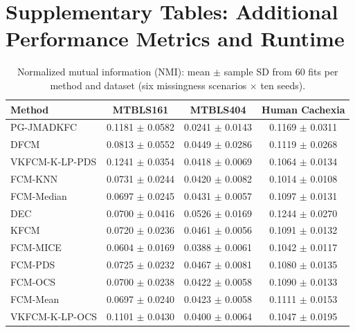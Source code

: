 \section*{Supplementary Tables: Additional Performance Metrics and Runtime}

\begin{table}[t]
\centering
\caption{Normalized mutual information (NMI): mean $\pm$ sample SD from 60 fits per method and dataset (six missingness scenarios $\times$ ten seeds).}
\label{tab:supp_nmi}
\small
\setlength{\tabcolsep}{5pt}
\begin{tabular}{lccc}
\toprule
Method & MTBLS161 & MTBLS404 & Human Cachexia \\
\midrule
PG-JMADKFC & 0.1181 $\pm$ 0.0582 & 0.0241 $\pm$ 0.0143 & 0.1169 $\pm$ 0.0311 \\
DFCM & 0.0813 $\pm$ 0.0552 & 0.0449 $\pm$ 0.0286 & 0.1119 $\pm$ 0.0268 \\
VKFCM-K-LP-PDS & 0.1241 $\pm$ 0.0354 & 0.0418 $\pm$ 0.0069 & 0.1064 $\pm$ 0.0134 \\
FCM-KNN & 0.0731 $\pm$ 0.0244 & 0.0420 $\pm$ 0.0082 & 0.1014 $\pm$ 0.0108 \\
FCM-Median & 0.0697 $\pm$ 0.0245 & 0.0431 $\pm$ 0.0057 & 0.1097 $\pm$ 0.0131 \\
DEC & 0.0700 $\pm$ 0.0416 & 0.0526 $\pm$ 0.0169 & 0.1244 $\pm$ 0.0270 \\
KFCM & 0.0720 $\pm$ 0.0236 & 0.0461 $\pm$ 0.0056 & 0.1091 $\pm$ 0.0132 \\
FCM-MICE & 0.0604 $\pm$ 0.0169 & 0.0388 $\pm$ 0.0061 & 0.1042 $\pm$ 0.0117 \\
FCM-PDS & 0.0725 $\pm$ 0.0232 & 0.0467 $\pm$ 0.0081 & 0.1080 $\pm$ 0.0135 \\
FCM-OCS & 0.0700 $\pm$ 0.0238 & 0.0422 $\pm$ 0.0058 & 0.1090 $\pm$ 0.0133 \\
FCM-Mean & 0.0697 $\pm$ 0.0240 & 0.0423 $\pm$ 0.0058 & 0.1111 $\pm$ 0.0153 \\
VKFCM-K-LP-OCS & 0.1101 $\pm$ 0.0430 & 0.0400 $\pm$ 0.0064 & 0.1047 $\pm$ 0.0195 \\
\bottomrule
\end{tabular}
\end{table}

